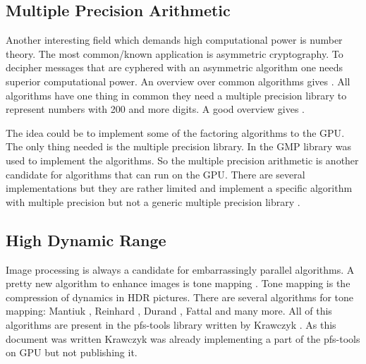 
\subsection{Multiple Precision Arithmetic} %
\label{par:multiple_precision_arithmetic}
Another interesting field which demands high computational power is number
theory. The most common/known application is asymmetric cryptography. To
decipher messages that are cyphered with an asymmetric algorithm one needs
superior computational power. An overview over common algorithms gives
\citep{citeulike:3783254}. All algorithms have one thing in common they need a
multiple precision library to represent numbers with 200 and more digits. A good
overview gives \citep{citeulike:3783244}.

The idea could be to implement some of the factoring algorithms to the \gls{GPU}.
The only thing needed is the multiple precision library. In \citep{citeulike:3783254} the
\gls{GMP} library was used to implement the algorithms. So
the multiple precision arithmetic is another candidate for algorithms that can
run on the \gls{GPU}. There are several implementations but they are rather limited
and implement a specific algorithm with multiple precision but not a generic multiple
precision library \citep{citeulike:6661955, citeulike:6661957}. 


\subsection{High Dynamic Range} %
\label{par:high_dynamic_range}
Image processing is always a candidate for embarrassingly parallel algorithms. A
pretty new algorithm to enhance images is tone mapping
\citep{citeulike:3783303}. Tone mapping is the compression of dynamics in
\gls{HDR} pictures. There are several algorithms for tone mapping: Mantiuk
\citep{citeulike:3783315}, Reinhard \citep{citeulike:3783311}, Durand
\citep{citeulike:789299}, Fattal \citep{citeulike:3783313} and many more. All of
this algorithms are present in the pfs-tools library written by Krawczyk
\citep{citeulike:3783303}. As this document was written Krawczyk was already
implementing a part of the pfs-tools on \gls{GPU} but not publishing it. 


